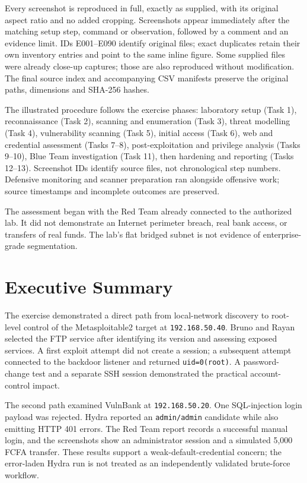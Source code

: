 \documentclass[11pt,a4paper]{article}
\newcommand{\insight}[2]{\begin{notebox}[#1]#2\end{notebox}}
\begin{document}
Every screenshot is reproduced in full, exactly as supplied, with its original aspect ratio and no added cropping. Screenshots appear immediately after the matching setup step, command or observation, followed by a comment and an evidence limit. IDs E001--E090 identify original files; exact duplicates retain their own inventory entries and point to the same inline figure. Some supplied files were already close-up captures; those are also reproduced without modification. The final source index and accompanying CSV manifests preserve the original paths, dimensions and SHA-256 hashes.

\insight{Exercise Reading Order}{The illustrated procedure follows the exercise phases: laboratory setup (Task 1), reconnaissance (Task 2), scanning and enumeration (Task 3), threat modelling (Task 4), vulnerability scanning (Task 5), initial access (Task 6), web and credential assessment (Tasks 7--8), post-exploitation and privilege analysis (Tasks 9--10), Blue Team investigation (Task 11), then hardening and reporting (Tasks 12--13). Screenshot IDs identify source files, not chronological step numbers. Defensive monitoring and scanner preparation ran alongside offensive work; source timestamps and incomplete outcomes are preserved.}

\insight{Important Scope Boundary}{The assessment began with the Red Team already connected to the authorized lab. It did not demonstrate an Internet perimeter breach, real bank access, or transfers of real funds. The lab's flat bridged subnet is not evidence of enterprise-grade segmentation.}

\clearpage
\tableofcontents
\clearpage
\listoffigures
\clearpage
{}

\section{Executive Summary}
The exercise demonstrated a direct path from local-network discovery to root-level control of the Metasploitable2 target at \texttt{192.168.50.40}. Bruno and Rayan selected the FTP service after identifying its version and assessing exposed services. A first exploit attempt did not create a session; a subsequent attempt connected to the backdoor listener and returned \texttt{uid=0(root)}. A password-change test and a separate SSH session demonstrated the practical account-control impact.

The second path examined VulnBank at \texttt{192.168.50.20}. One SQL-injection login payload was rejected. Hydra reported an \texttt{admin/admin} candidate while also emitting HTTP 401 errors. The Red Team report records a successful manual login, and the screenshots show an administrator session and a simulated 5,000 FCFA transfer. These results support a weak-default-credential concern; the error-laden Hydra run is not treated as an independently validated brute-force workflow.
\end{document}
